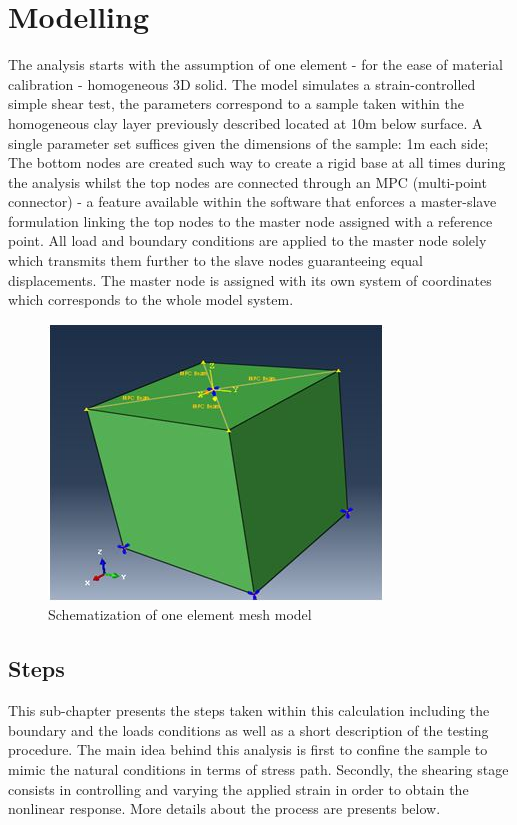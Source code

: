 \documentclass[11pt,a4paper]{report}
\begin{document}
\section{Modelling}

The analysis starts with the assumption of one element - for the ease of material calibration - homogeneous 3D solid. The model simulates a strain-controlled simple shear test, the parameters correspond to a sample taken within the homogeneous clay layer previously described located at 10m below surface. A single parameter set suffices given the dimensions of the sample: 1m each side; The bottom nodes are created such way to create a rigid base at all times during the analysis whilst the top nodes are connected through an MPC (multi-point connector) - a feature available within the software that enforces a master-slave formulation linking the top nodes to the master node assigned with a reference point. All load and boundary conditions are applied to the master node solely which transmits them further to the slave nodes guaranteeing equal displacements. The master node is assigned with its own system of coordinates which corresponds to the whole model system.

\begin{figure}[h!]
	\centering
	\includegraphics[width=0.7\linewidth]{"1dmodel"}
	\caption{Schematization of one element mesh model }
	\label{cube}
\end{figure}

\subsection{Steps}
This sub-chapter presents the steps taken within this calculation including the boundary and the loads conditions as well as a short description of the testing procedure. The main idea behind this analysis is first to confine the sample to mimic the natural conditions in terms of stress path. Secondly, the shearing stage consists in controlling and varying the applied strain in order to obtain the nonlinear response. More details about the process are presents below. 
\end{document}
